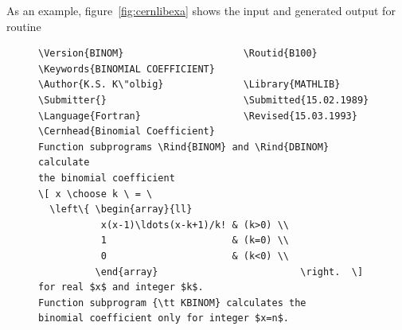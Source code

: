 \documentclass[a4paper,11pt]{cernman}
\def\vref#1{\ref{#1}}
\begin{document}
\begin{latexonly}
As an example, figure~\vref{fig:cernlibexa} shows 
the input and generated output for \CERNLIB{} routine 

\begin{figure}[p]
  \begin{sideways}
   \begin{minipage}[b]{\textheight}
    \begin{minipage}[b]{.49\textwidth}
    \scriptsize%
    \begin{verbatim}
\Version{BINOM}                     \Routid{B100}
\Keywords{BINOMIAL COEFFICIENT}
\Author{K.S. K\"olbig}              \Library{MATHLIB}
\Submitter{}                        \Submitted{15.02.1989}
\Language{Fortran}                  \Revised{15.03.1993}
\Cernhead{Binomial Coefficient}
Function subprograms \Rind{BINOM} and \Rind{DBINOM} calculate
the binomial coefficient
\[ x \choose k \ = \ 
  \left\{ \begin{array}{ll}
           x(x-1)\ldots(x-k+1)/k! & (k>0) \\
           1                      & (k=0) \\
           0                      & (k<0) \\
          \end{array}                         \right.  \]
for real $x$ and integer $k$.
Function subprogram {\tt KBINOM} calculates the
binomial coefficient only for integer $x=n$.


\end{verbatim}
\end{minipage}
\end{minipage}
\end{sideways}
\end{figure}
\end{latexonly}
\end{document}
